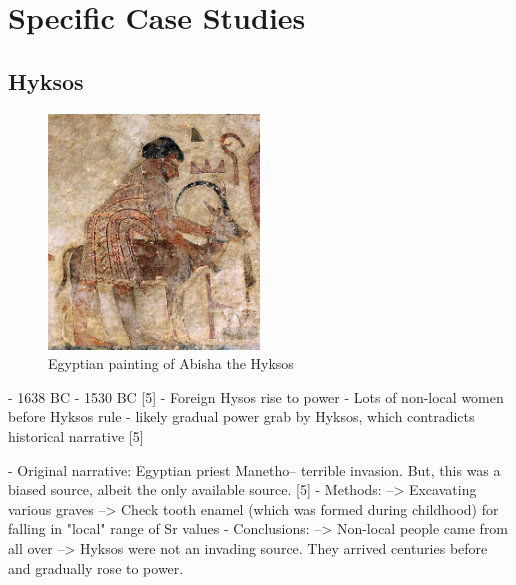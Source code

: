 \documentclass[a4paper, 12pt]{article}
\begin{document}

\section{Specific Case Studies}
\subsection{Hyksos}

\begin{figure}[htbp]
    \centering
    \includegraphics[width=0.5\textwidth]{hyksos_painting.jpg}
    \caption{Egyptian painting of Abisha the Hyksos \citep{wikipediaHyksos}}
    \label{fig:hyksos_painting}
\end{figure}

- 1638 BC - 1530 BC [5]
- Foreign Hysos rise to power
- Lots of non-local women before Hyksos rule - likely gradual power grab by Hyksos, which contradicts historical narrative [5]

- Original narrative: Egyptian priest Manetho-- terrible invasion. But, this was a biased source, albeit the only available source. [5]
- Methods:
--> Excavating various graves
--> Check tooth enamel (which was formed during childhood) for falling in "local" range of Sr values
- Conclusions:
--> Non-local people came from all over
--> Hyksos were not an invading source. They arrived centuries before and gradually rose to power.
\end{document}
